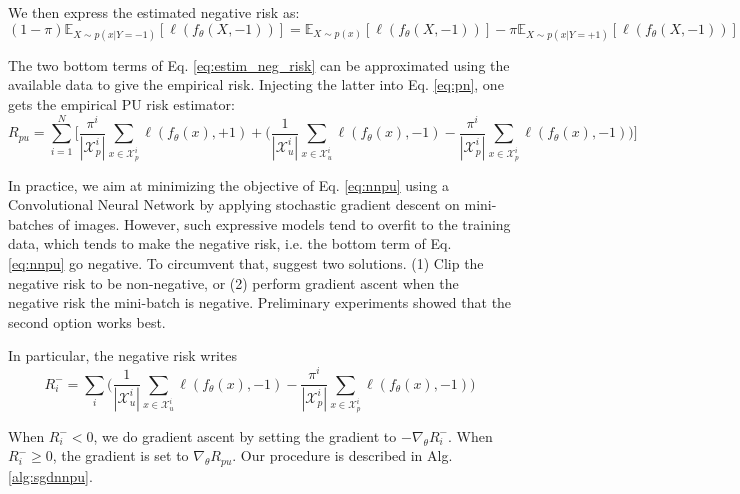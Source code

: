 We then express the estimated negative risk as:
\begin{equation}
  \label{eq:estim_neg_risk}
   (1-\pi) \mathbb{E}_{X \sim p(x|Y=-1)}\left[\ell(f_\theta(X,-1)) \right] =
    \mathbb{E}_{X \sim p(x)}\left[\ell(f_\theta(X,-1)) \right]
    - \pi \mathbb{E}_{X \sim p(x|Y=+1)}\left[\ell(f_\theta(X,-1)) \right]
\end{equation}

The two bottom terms of Eq. \ref{eq:estim_neg_risk} can be approximated using the available data to give the empirical risk.
Injecting the latter into Eq. \ref{eq:pn}, one gets the empirical PU risk estimator:
\begin{equation}
  \label{eq:nnpu}
R_{pu}=\sum_{i=1}^{N}\Biggl[ \frac{\pi^{i}}{|\mathcal{X}^{i}_{p}|}\sum_{x \in \mathcal{X}^{i}_p}\ell(f_{\theta}(x),+1) +
\Biggl( \frac{1}{|\mathcal{X}^{i}_{u}|}\sum_{x \in \mathcal{X}^{i}_u}\ell(f_{\theta}(x),-1) -
\frac{\pi^{i}}{|\mathcal{X}^{i}_{p}|}\sum_{x \in \mathcal{X}^{i}_p}\ell(f_{\theta}(x),-1) \Biggr) \Biggr]
\end{equation}

In practice, we aim at minimizing the objective of Eq. \ref{eq:nnpu} using a Convolutional Neural Network by applying stochastic gradient descent on mini-batches of images.
However, such expressive models tend to overfit to the training data, which tends to make the negative risk, i.e. the bottom term of Eq. \ref{eq:nnpu} go negative.
To circumvent that, \cite{kiryo17} suggest two solutions.
(1) Clip the negative risk to be non-negative, or (2) perform gradient ascent when the negative risk the mini-batch is negative.
Preliminary experiments showed that the second option works best.

In particular, the negative risk writes
\begin{equation}
  \label{eq:neg_risk}
R_{i}^{-}=\sum_{i}\Biggl(
 \frac{1}{|\mathcal{X}^{i}_{u}|}\sum_{x \in \mathcal{X}^{i}_u}\ell(f_{\theta}(x),-1) -
\frac{\pi^{i}}{|\mathcal{X}^{i}_{p}|}\sum_{x \in \mathcal{X}^{i}_p}\ell(f_{\theta}(x),-1) \Biggr)
\end{equation}

When \(R_{i}^{-} < 0\), we do gradient ascent by setting the gradient to \(-\nabla_\theta R_{i}^{-}\).
When \(R_{i}^{-} \geq 0\), the gradient is set to \(\nabla_\theta R_{pu}\).
Our procedure is described in Alg. \ref{alg:sgdnnpu}.

